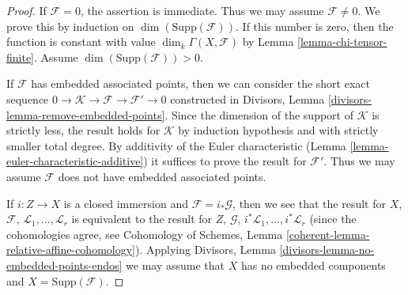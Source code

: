 \begin{proof}
If $\mathcal{F} = 0$, the assertion is immediate. Thus we may assume
$\mathcal{F} \not = 0$.
We prove this by induction on $\dim(\text{Supp}(\mathcal{F}))$.
If this number is zero, then the function is constant with value
$\dim_k \Gamma(X, \mathcal{F})$ by Lemma \ref{lemma-chi-tensor-finite}.
Assume $\dim(\text{Supp}(\mathcal{F})) > 0$.

\medskip\noindent
If $\mathcal{F}$ has embedded associated points, then we can consider
the short exact sequence
$0 \to \mathcal{K} \to \mathcal{F} \to \mathcal{F}' \to 0$
constructed in Divisors, Lemma \ref{divisors-lemma-remove-embedded-points}.
Since the dimension of the support of $\mathcal{K}$ is strictly less,
the result holds for $\mathcal{K}$ by induction hypothesis and with
strictly smaller total degree.
By additivity of the Euler characteristic
(Lemma \ref{lemma-euler-characteristic-additive})
it suffices to prove the result for $\mathcal{F}'$. Thus we may assume
$\mathcal{F}$ does not have embedded associated points.

\medskip\noindent
If $i : Z \to X$ is a closed immersion and $\mathcal{F} = i_*\mathcal{G}$,
then we see that the result for $X$, $\mathcal{F}$,
$\mathcal{L}_1, \ldots, \mathcal{L}_r$ is equivalent to the result
for $Z$, $\mathcal{G}$, $i^*\mathcal{L}_1, \ldots, i^*\mathcal{L}_r$
(since the cohomologies agree, see
Cohomology of Schemes, Lemma \ref{coherent-lemma-relative-affine-cohomology}).
Applying Divisors, Lemma \ref{divisors-lemma-no-embedded-points-endos}
we may assume that $X$ has no embedded components and
$X = \text{Supp}(\mathcal{F})$.


\end{proof}
